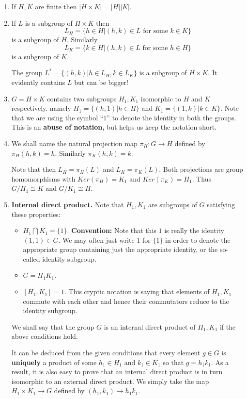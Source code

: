 \documentclass[12pt]{article}
\begin{document}
\begin{enumerate}
\item If $H,K$ are finite then $|H\times K| = |H||K|$.
\item If $L$ is a subgroup of $H\times K$ then 
$$L_H = \{h\in H | (h,k)\in L \mbox{ for some }k\in K\}$$ 
is a subgroup of $H$. 
Similarly 
$$L_K = \{k\in H | (h,k)\in L \mbox{ for some }h\in H\}$$ is a subgroup
of $K$.

The group $L^*=\{(h,k)|h\in L_H,k\in L_K\}$ is a subgroup of $H\times K$.
It evidently contains $L$ but can be bigger!
\item $G=H\times K$ contains two subgroups $H_1,K_1$ isomorphic to $H$
and $K$ respectively. namely $H_1=\{ (h,1)|h\in H\}$ and
$K_1=\{(1,k)|k\in K\}$. Note that we are using the symbol ``$1$'' to
denote the identity in both the groups. This is an {\bf abuse of
notation,}
but helps us keep the notation short.
\item
We shall name the natural projection map $\pi_H:G\rightarrow H$ defined
by $\pi_H(h,k) = h$. Similarly $\pi_K(h,k)=k$.

Note that then $L_H=\pi_H(L)$ and $L_K=\pi_K(L)$.
Both projections are group homomorphisms with $Ker(\pi_H)=K_1$ and
$Ker(\pi_K)=H_1$. Thus $G/H_1\cong K$ and $G/K_1\cong H$.

\item {\bf Internal direct product.}
Note that $H_1,K_1$ are subgroups of $G$ satisfying these properties:

\begin{itemize}
\item $H_1\bigcap K_1 = \{1\}$. 
{\bf Convention:} Note that this $1$ is really the
identity $(1,1)\in G$. We may often just write $1$ for $\{1\}$ in order
to denote the appropriate group containing just the appropriate
identity, or the so-called identity subgroup.

\item $G=H_1K_1$.
\item $[H_1,K_1]=1$. This cryptic notation is saying that elements of
$H_1,K_1$ commute with each other and hence their commutators reduce to
the identity subgroup.

\end{itemize}
We shall say that the group $G$ is an internal direct product of
$H_1,K_1$ if the above conditions hold. 

It can be deduced from the given conditions that every element 
$g \in G$ is {\bf uniquely} a product of some $h_1\in H_1$ and $k_1\in K_1$ so that 
$g=h_1k_1$. As a result, it is also easy to prove that an internal
direct product is in turn isomorphic to an external direct product. We
simply take the map $H_1\times K_1 \rightarrow G$ defined by
$(h_1,k_1)\rightarrow h_1k_1$.


\end{enumerate}
\end{document}
